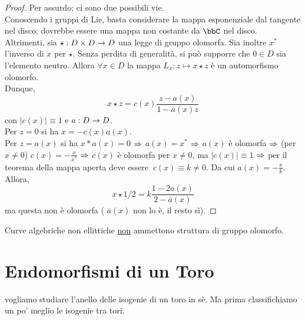 \begin{proof}
Per assurdo; ci sono due possibili vie.\\
Conoscendo i gruppi di Lie, basta considerare la mappa esponenziale dal tangente nel disco: dovrebbe essere una mappa non costante da $\bbC$ nel disco. \hfill \Lightning \\
Altrimenti, sia $\star : D\times D \rightarrow D$ una legge di gruppo olomorfa. Sia inoltre $x^{*}$ l'inverso di $x$ per $\star$. Senza perdita di generalità, si può supporre che $0 \in D$ sia l'elemento neutro.
Allora $\forall x\in D$ la mappa $L_{x}: z\mapsto x\star z$ è un automorfismo olomorfo. \\
Dunque,  $$x\star z = c(x)\frac{z -a(x)}{1- \overline{a}(x) z}$$
con $|c(x)|\equiv 1$ e $a:D \rightarrow D$.\\
Per $z=0$ si ha $x=-c(x)a(x)$.\\
Per $z=a(x)$ si ha $x*a(x)=0$ $\Rightarrow$ $a(x)=x^{*}$ $\Rightarrow$ $a(x)$ è olomorfa $\Rightarrow$ (per $x\neq 0$) $c(x)=-\frac{x}{x^{*}}$ $\Rightarrow$ $c(x)$ è olomorfa per $x\neq 0$, ma $|c(x)| \equiv 1$ $\Rightarrow$ per il teorema della mappa aperta deve essere $ \ c(x) \equiv k \neq 0$. Da cui $a(x)= -\frac{x}{k}$.\\
Allora, $$x\star 1/2 = k\frac{1-2a(x)}{2-\overline{a}(x)}$$
ma questa non è olomorfa ( $\overline{a}(x)$ non lo è, il resto sì). 

\end{proof}

\begin{corollario}
Curve algebriche non ellittiche \underline{non} ammettono struttura di gruppo olomorfo.
\end{corollario}

\section{Endomorfismi di un Toro}

 vogliamo studiare l'anello delle isogenie di un toro in sè. Ma prima classifichiamo un po' meglio le isogenie tra tori.

